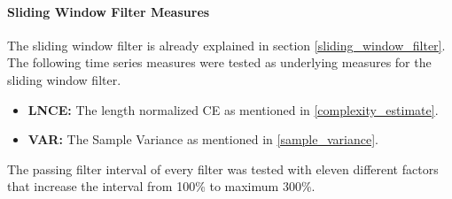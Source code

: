 \paragraph{Sliding Window Filter Measures} \label{sliding_window_filter_measures}
The sliding window filter is already explained in section \ref{sliding_window_filter}. The following time series
measures were tested as underlying measures for the sliding window filter.

\begin{itemize}
    \item \textbf{LNCE:} The length normalized CE as mentioned in \ref{complexity_estimate}.
    \item \textbf{VAR:} The Sample Variance as mentioned in \ref{sample_variance}.
\end{itemize}
The passing filter interval of every filter was tested with eleven different factors that increase the interval
from 100\% to maximum 300\%.
